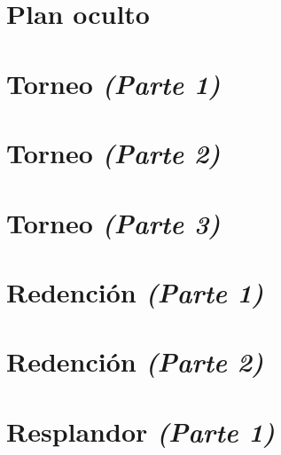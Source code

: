 \documentclass[11pt,a5paper]{book}
\title{\textbf{\Huge\titlename}\\\textsc{\small\subtitlename}\setcounter{page}{3}}
\author{\textit{\authorname}}
\date{}
\begin{document}
\pagecolor{black}
\thispagestyle{empty}

\newpage\pagecolor{white}

\frontmatter
\thispagestyle{empty}
\hbox{}\newpage
\thispagestyle{empty}


\maketitle

\cleardoublepage
\raggedcolumns
\tableofcontents
\flushcolumns

\mainmatter
\setcounter{chapter}{24}
\chapter{Plan oculto}


\chapter{Torneo \emph{\mdseries(Parte 1)}}


\chapter{Torneo \emph{\mdseries(Parte 2)}}


\chapter{Torneo \emph{\mdseries(Parte 3)}}


\chapter{Redención \emph{\mdseries(Parte 1)}}


\chapter{Redención \emph{\mdseries(Parte 2)}}


\chapter{Resplandor \emph{\mdseries(Parte 1)}}

\end{document}
